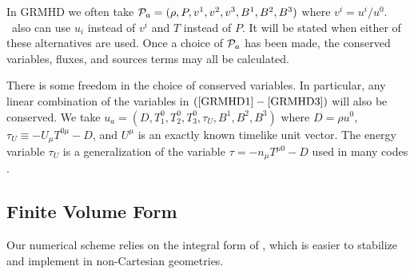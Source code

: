 In GRMHD we often take $\mathcal{P}_a = (\rho, P, v^1, v^2, v^3, B^1, B^2, B^3)$ where $v^i = u^i/u^0$.  \grdisco\ also can use $u_i$ instead of $v^i$ and $T$ instead of $P$.  It will be stated when either of these alternatives are used. Once a choice of $\mathcal{P}_a$ has been made, the conserved variables, fluxes, and sources terms may all be calculated.

There is some freedom in the choice of conserved variables.  In particular, any linear combination of the variables in $(\eqref{GRMHD1}-\eqref{GRMHD3})$ will also be conserved.  We take $u_a = (D, T^0_1, T^0_2, T^0_3, \tau_U, B^1, B^2, B^3)$ where $D = \rho u^0$, $\tau_U \equiv -U_\mu T^{0\mu}-D$, and $U^\mu$ is an exactly known timelike unit vector.  The energy variable $\tau_U$ is a generalization of the variable $\tau = -n_\mu T^{\mu0} - D$ used in many codes \citep{HARM, Duez05}.

\subsection{Finite Volume Form}
Our numerical scheme relies on the integral form of , which is easier to stabilize and implement in non-Cartesian geometries.  

